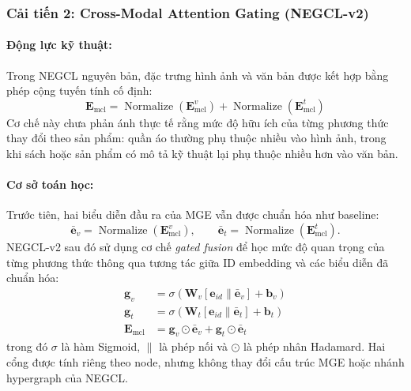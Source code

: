 \subsubsection{Cải tiến 2: Cross-Modal Attention Gating (NEGCL-v2)}

\paragraph{Động lực kỹ thuật:}
Trong NEGCL nguyên bản, đặc trưng hình ảnh và văn bản được kết hợp bằng phép cộng tuyến tính cố định:
\begin{equation}
\mathbf{E}_{\text{mcl}} = \operatorname{Normalize}\!\left(\mathbf{E}^{v}_{\text{mcl}}\right) + \operatorname{Normalize}\!\left(\mathbf{E}^{t}_{\text{mcl}}\right)
\label{eq:negcl_v2_baseline}
\end{equation}
Cơ chế này chưa phản ánh thực tế rằng mức độ hữu ích của từng phương thức thay đổi theo sản phẩm: quần áo thường phụ thuộc nhiều vào hình ảnh, trong khi sách hoặc sản phẩm có mô tả kỹ thuật lại phụ thuộc nhiều hơn vào văn bản.

\paragraph{Cơ sở toán học:}
Trước tiên, hai biểu diễn đầu ra của MGE vẫn được chuẩn hóa như baseline:
\begin{equation}
\bar{\mathbf{e}}_v=\operatorname{Normalize}(\mathbf{E}^{v}_{\text{mcl}}),
\qquad
\bar{\mathbf{e}}_t=\operatorname{Normalize}(\mathbf{E}^{t}_{\text{mcl}}).
\end{equation}
NEGCL-v2 sau đó sử dụng cơ chế \textit{gated fusion} để học mức độ quan trọng của từng phương thức thông qua tương tác giữa ID embedding và các biểu diễn đã chuẩn hóa:
\begin{align}
\mathbf{g}_{v} &= \sigma\!\left(\mathbf{W}_v \left[\mathbf{e}_{id} \| \bar{\mathbf{e}}_v\right] + \mathbf{b}_v\right) \\
\mathbf{g}_{t} &= \sigma\!\left(\mathbf{W}_t \left[\mathbf{e}_{id} \| \bar{\mathbf{e}}_t\right] + \mathbf{b}_t\right) \\
\mathbf{E}_{\text{mcl}} &= \mathbf{g}_{v} \odot \bar{\mathbf{e}}_v + \mathbf{g}_{t} \odot \bar{\mathbf{e}}_t
\end{align}
trong đó $\sigma$ là hàm Sigmoid, $\|$ là phép nối và $\odot$ là phép nhân Hadamard. Hai cổng được tính riêng theo node, nhưng không thay đổi cấu trúc MGE hoặc nhánh hypergraph của NEGCL.


